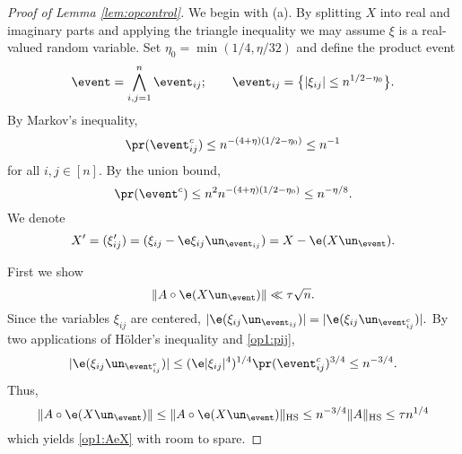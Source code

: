 \documentclass[aop,preprint]{imsart}
\theoremstyle{plain}
\theoremstyle{definition}
\theoremstyle{remark}
\numberwithin{equation}{section}
\numberwithin{theorem}{section}
\def \HS {\mathrm{HS}}
\begin{document}
\begin{proof}[Proof of Lemma \ref{lem:opcontrol}]
We begin with (a). 
By splitting $X$ into real and imaginary parts and applying the triangle inequality we may assume $\xi$ is a real-valued random variable.
Set $\eta_0= \min(1/4,\eta/32)$ and define the product event
\begin{equation}	\label{op1:eij}
\event = \bigwedge_{i,j=1}^n \event_{ij}; \quad\quad \event_{ij} = \big\{ |\xi_{ij}| \le n^{1/2-\eta_0}\big\}.
\end{equation}
By Markov's inequality,
\begin{equation}	\label{op1:pij}
\pr( \event_{ij}^c) \le n^{-(4+\eta)(1/2-\eta_0)} \le n^{-1}
\end{equation}
for all $i,j\in [n]$.
By the union bound,
\begin{equation}	\label{op1:event}
\pr(\event^c) \le n^2 n^{-(4+\eta)(1/2-\eta_0)} \le n^{-\eta/8}.
\end{equation}
We denote
\[
X' = (\xi_{ij}')  = (\xi_{ij} - \e\xi_{ij}\un_{\event_{ij}}) = X - \e (X\un_{\event}).
\]

First we show 
\begin{equation}	\label{op1:AeX}
\|A\circ \e(X\un_{\event})\| \ll \tau \sqrt{n}.
\end{equation}
Since the variables $\xi_{ij}$ are centered, 
$
|\e(\xi_{ij}\un_{\event_{ij}})|  =  | \e (\xi_{ij} \un_{\event_{ij}^c})|.
$
By two applications of H\"older's inequality and \eqref{op1:pij}, 
\[
|\e (\xi_{ij} \un_{\event_{ij}^c})| \le (\e |\xi_{ij}|^4)^{1/4} \pr(\event_{ij}^c)^{3/4} \le n^{-3/4}.
\]
Thus,
\begin{equation}
\|A\circ \e(X\un_{\event})\| \le \|A\circ \e(X\un_{\event})\|_{\HS} \le n^{-3/4} \|A\|_{\HS} \le \tau n^{1/4}
\end{equation}
which yields \eqref{op1:AeX} with room to spare.


\end{proof}
\end{document}
